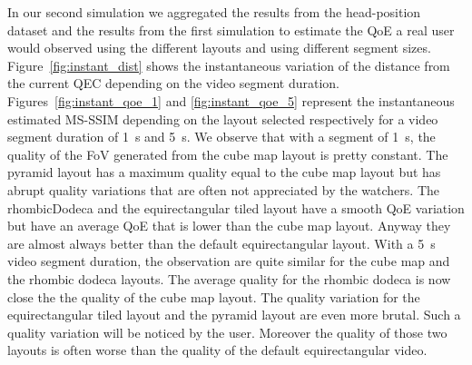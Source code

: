 %     

In our second simulation we aggregated the results from the
head-position dataset and the results from the first simulation to
estimate the \ac{QoE} a real user would  observed using the different
layouts and using different segment sizes.
Figure~\ref{fig:instant_dist} shows the instantaneous variation of the
distance from the current \ac{QEC} depending on the video segment
duration. Figures~\ref{fig:instant_qoe_1} and \ref{fig:instant_qoe_5}
represent the instantaneous estimated \ac{MS-SSIM} depending on the
layout selected respectively for a video segment duration of
\SI{1}{\second} and \SI{5}{\second}. We observe that with a segment of
\SI{1}{\second}, the quality of the \ac{FoV} generated from the cube
map layout is pretty constant. The pyramid layout has a maximum
quality equal to the cube map layout but has abrupt quality variations
that are often not appreciated by the watchers. The rhombicDodeca and
the equirectangular tiled layout have a smooth \ac{QoE} variation but
have an average \ac{QoE} that is lower than the cube map layout.
Anyway they are almost always better than the default equirectangular
layout. With a \SI{5}{\second} video segment duration, the observation
are quite similar for the cube map and the rhombic dodeca layouts. The
average quality for the rhombic dodeca is now close the the quality of
the cube map layout. The quality variation for the equirectangular
tiled layout and the pyramid layout are even more brutal. Such a
quality variation will be noticed by the user. Moreover the quality of
those two layouts is often worse than the quality of the default
equirectangular video.
